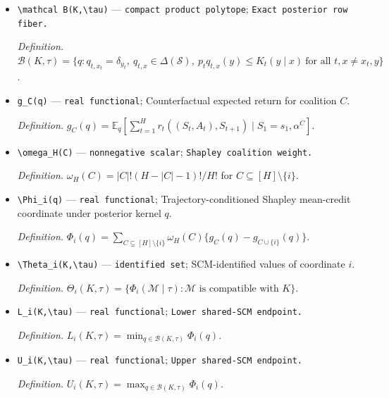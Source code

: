 \documentclass{article}
\begin{document}
\begin{itemize}
  \par\smallskip\noindent\emph{Definition.} \(q=(q_{t,x}(y):t\in[H],x\in\mathcal X,y\in\mathcal S)\).
  \item \texttt{\textbackslash{}\allowbreak{}mathcal B(K,\allowbreak{}\textbackslash{}\allowbreak{}tau)} --- \texttt{compact product polytope}; \texttt{Exact posterior row fiber.}
  \par\smallskip\noindent\emph{Definition.} \(\mathcal B(K,\tau)=\{q:q_{t,x_t}=\delta_{y_t},\ q_{t,x}\in\Delta(\mathcal S),\ p_tq_{t,x}(y)\le K_t(y\mid x)\ \text{for all }t,x\ne x_t,y\}\).
  \item \texttt{g\_\allowbreak{}C(q)} --- \texttt{real functional}; Counterfactual expected return for coalition \(C\).
  \par\smallskip\noindent\emph{Definition.} \(g_C(q)=\mathbb E_q[\sum_{t=1}^H r_t((S_t,A_t),S_{t+1})\mid S_1=s_1,\alpha^C]\).
  \item \texttt{\textbackslash{}\allowbreak{}omega\_\allowbreak{}H(C)} --- \texttt{nonnegative scalar}; \texttt{Shapley coalition weight.}
  \par\smallskip\noindent\emph{Definition.} \(\omega_H(C)=|C|!(H-|C|-1)!/H!\) for \(C\subseteq[H]\setminus\{i\}\).
  \item \texttt{\textbackslash{}\allowbreak{}Phi\_\allowbreak{}i(q)} --- \texttt{real functional}; Trajectory-conditioned Shapley mean-credit coordinate under posterior kernel \(q\).
  \par\smallskip\noindent\emph{Definition.} \(\Phi_i(q)=\sum_{C\subseteq[H]\setminus\{i\}}\omega_H(C)\{g_C(q)-g_{C\cup\{i\}}(q)\}\).
  \item \texttt{\textbackslash{}\allowbreak{}Theta\_\allowbreak{}i(K,\allowbreak{}\textbackslash{}\allowbreak{}tau)} --- \texttt{identified set}; SCM-identified values of coordinate \(i\).
  \par\smallskip\noindent\emph{Definition.} \(\Theta_i(K,\tau)=\{\Phi_i(\mathcal M\mid\tau):\mathcal M\text{ is compatible with }K\}\).
  \item \texttt{L\_\allowbreak{}i(K,\allowbreak{}\textbackslash{}\allowbreak{}tau)} --- \texttt{real functional}; \texttt{Lower shared-\allowbreak{}SCM endpoint.}
  \par\smallskip\noindent\emph{Definition.} \(L_i(K,\tau)=\min_{q\in\mathcal B(K,\tau)}\Phi_i(q)\).
  \item \texttt{U\_\allowbreak{}i(K,\allowbreak{}\textbackslash{}\allowbreak{}tau)} --- \texttt{real functional}; \texttt{Upper shared-\allowbreak{}SCM endpoint.}
  \par\smallskip\noindent\emph{Definition.} \(U_i(K,\tau)=\max_{q\in\mathcal B(K,\tau)}\Phi_i(q)\).

\end{itemize}
\end{document}
